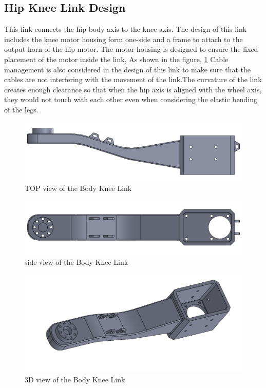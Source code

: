 \subsection{Hip Knee Link Design}
This link connects the hip body axis to the knee axis.
The design of this link includes the knee motor housing form one-side and a frame to attach to the output horn of the hip motor.
The motor housing is designed to ensure the fixed placement of the motor inside the link, As shown in the figure, \ref{fig:bodykneelink1} Cable management is also considered in the design of this link to make sure that the cables are not interfering with the movement of the link.The curvature of the link creates enough clearance so that when the hip axis is aligned with the wheel axis, they would not touch with each other even when considering the elastic bending of the legs.
\begin{figure}[h]
	\centering
	\includegraphics[width=1\linewidth]{Body_Knee_Link_1}
	\caption[TOP view of the Body Knee Link]{TOP view of the Body Knee Link}
	\label{fig:bodykneelink1}
\end{figure}
\begin{figure}[h]
	\centering
	\includegraphics[width=1\linewidth]{Body_Knee_Link_2}
	\caption[Side view of the Body Knee Link]{side view of the Body Knee Link}
	\label{fig:bodykneelink2}
\end{figure}
\begin{figure}[h]
	\centering
	\includegraphics[width=1\linewidth]{Body_Knee_Link_3}
	\caption[3D view of the Body Knee Link]{3D view of the Body Knee Link}
	\label{fig:bodykneelink3}
\end{figure}

